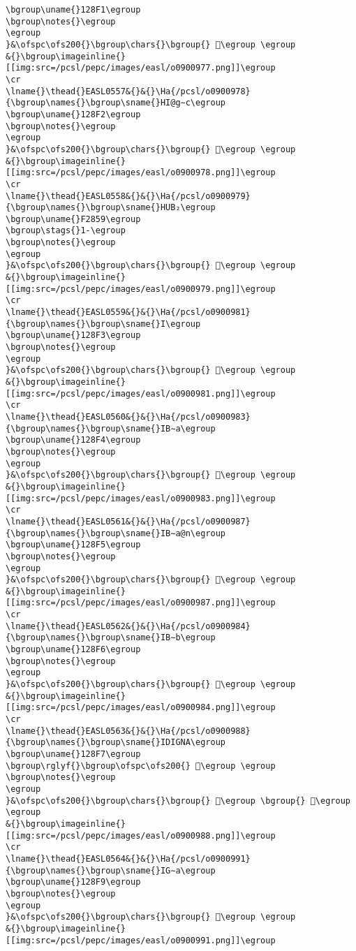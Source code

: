 \begin{verbatim}
\bgroup\uname{}128F1\egroup
\bgroup\notes{}\egroup
\egroup
}&\ofspc\ofs200{}\bgroup\chars{}\bgroup{} 𒣱\egroup \egroup
&{}\bgroup\imageinline{}[[img:src=/pcsl/pepc/images/easl/o0900977.png]]\egroup
\cr
\lname{}\thead{}EASL0557&{}&{}\Ha{/pcsl/o0900978}{\bgroup\names{}\bgroup\sname{}HI@g∼c\egroup
\bgroup\uname{}128F2\egroup
\bgroup\notes{}\egroup
\egroup
}&\ofspc\ofs200{}\bgroup\chars{}\bgroup{} 𒣲\egroup \egroup
&{}\bgroup\imageinline{}[[img:src=/pcsl/pepc/images/easl/o0900978.png]]\egroup
\cr
\lname{}\thead{}EASL0558&{}&{}\Ha{/pcsl/o0900979}{\bgroup\names{}\bgroup\sname{}HUB₂\egroup
\bgroup\uname{}F2859\egroup
\bgroup\stags{}1-\egroup
\bgroup\notes{}\egroup
\egroup
}&\ofspc\ofs200{}\bgroup\chars{}\bgroup{} 󲡙\egroup \egroup
&{}\bgroup\imageinline{}[[img:src=/pcsl/pepc/images/easl/o0900979.png]]\egroup
\cr
\lname{}\thead{}EASL0559&{}&{}\Ha{/pcsl/o0900981}{\bgroup\names{}\bgroup\sname{}I\egroup
\bgroup\uname{}128F3\egroup
\bgroup\notes{}\egroup
\egroup
}&\ofspc\ofs200{}\bgroup\chars{}\bgroup{} 𒣳\egroup \egroup
&{}\bgroup\imageinline{}[[img:src=/pcsl/pepc/images/easl/o0900981.png]]\egroup
\cr
\lname{}\thead{}EASL0560&{}&{}\Ha{/pcsl/o0900983}{\bgroup\names{}\bgroup\sname{}IB∼a\egroup
\bgroup\uname{}128F4\egroup
\bgroup\notes{}\egroup
\egroup
}&\ofspc\ofs200{}\bgroup\chars{}\bgroup{} 𒣴\egroup \egroup
&{}\bgroup\imageinline{}[[img:src=/pcsl/pepc/images/easl/o0900983.png]]\egroup
\cr
\lname{}\thead{}EASL0561&{}&{}\Ha{/pcsl/o0900987}{\bgroup\names{}\bgroup\sname{}IB∼a@n\egroup
\bgroup\uname{}128F5\egroup
\bgroup\notes{}\egroup
\egroup
}&\ofspc\ofs200{}\bgroup\chars{}\bgroup{} 𒣵\egroup \egroup
&{}\bgroup\imageinline{}[[img:src=/pcsl/pepc/images/easl/o0900987.png]]\egroup
\cr
\lname{}\thead{}EASL0562&{}&{}\Ha{/pcsl/o0900984}{\bgroup\names{}\bgroup\sname{}IB∼b\egroup
\bgroup\uname{}128F6\egroup
\bgroup\notes{}\egroup
\egroup
}&\ofspc\ofs200{}\bgroup\chars{}\bgroup{} 𒣶\egroup \egroup
&{}\bgroup\imageinline{}[[img:src=/pcsl/pepc/images/easl/o0900984.png]]\egroup
\cr
\lname{}\thead{}EASL0563&{}&{}\Ha{/pcsl/o0900988}{\bgroup\names{}\bgroup\sname{}IDIGNA\egroup
\bgroup\uname{}128F7\egroup
\bgroup\rglyf{}\bgroup\ofspc\ofs200{} 𒣷\egroup \egroup
\bgroup\notes{}\egroup
\egroup
}&\ofspc\ofs200{}\bgroup\chars{}\bgroup{} 𒣸\egroup \bgroup{} 𒣷\egroup \egroup
&{}\bgroup\imageinline{}[[img:src=/pcsl/pepc/images/easl/o0900988.png]]\egroup
\cr
\lname{}\thead{}EASL0564&{}&{}\Ha{/pcsl/o0900991}{\bgroup\names{}\bgroup\sname{}IG∼a\egroup
\bgroup\uname{}128F9\egroup
\bgroup\notes{}\egroup
\egroup
}&\ofspc\ofs200{}\bgroup\chars{}\bgroup{} 𒣹\egroup \egroup
&{}\bgroup\imageinline{}[[img:src=/pcsl/pepc/images/easl/o0900991.png]]\egroup

\end{verbatim}

